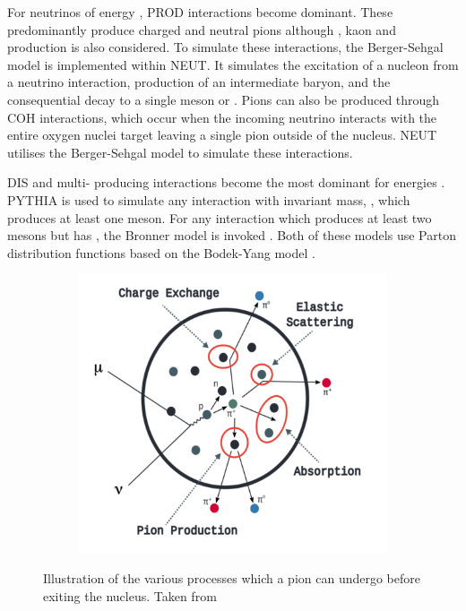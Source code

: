 For neutrinos of energy , PROD interactions become dominant. These predominantly produce charged and neutral pions although \quickmath{\gamma}, kaon and \quickmath{\eta} production is also considered. To simulate these interactions, the Berger-Sehgal \cite{PhysRevD.76.113004} model is implemented within NEUT. It simulates the excitation of a nucleon from a neutrino interaction, production of an intermediate baryon, and the consequential decay to a single meson or \quickmath{\gamma}. Pions can also be produced through COH interactions, which occur when the incoming neutrino interacts with the entire oxygen nuclei target leaving a single pion outside of the nucleus. NEUT utilises the Berger-Sehgal \cite{Berger_Sehgal_coh} model to simulate these interactions.

DIS and multi-\quickmath{\pi} producing interactions become the most dominant for energies . PYTHIA \cite{Sjstrand1994} is used to simulate any interaction with invariant mass, , which produces at least one meson. For any interaction which produces at least two mesons but has , the Bronner model is invoked \cite{Bronner2016}. Both of these models use Parton distribution functions based on the Bodek-Yang model \cite{Gl_ck_1998,10.48550/arxiv.1011.6592,10.48550/arxiv.1012.0261}. 

\begin{figure}[h]
  \begin{subfigure}[t]{0.8\textwidth}
    \includegraphics[width=\textwidth, trim={0mm 0mm 0mm 0mm}, clip,page=1]{Figures/Selections/FSIDiagram.pdf}
  \end{subfigure}
  \caption{Illustration of the various processes which a pion can undergo before exiting the nucleus. Taken from \cite{10.48550/arxiv.1602.05299}}
  \label{fig:Selection_FSIDiagram}
\end{figure}

